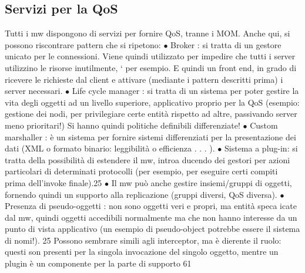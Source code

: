 \subsection{Servizi per la QoS}
Tutti i mw dispongono di servizi per fornire QoS, tranne i MOM. Anche qui, si
possono riscontrare pattern che si ripetono:
$\bullet$ Broker : si tratta di un gestore unicato per le connessioni. Viene quindi
utilizzato per impedire che tutti i server utilizzino le risorse inutilmente,
`
per esempio. E quindi un front end, in grado di ricevere le richieste dal
client e attivare (mediante i pattern descritti prima) i server necessari.
$\bullet$ Life cycle manager : si tratta di un sistema per poter gestire la vita degli
oggetti ad un livello superiore, applicativo proprio per la QoS (esempio:
gestione dei nodi, per privilegiare certe entità rispetto ad altre, passivando
server meno prioritari!) Si hanno quindi politiche definibili differenziate!
$\bullet$ Custom marshaller : è un sistema per fornire sistemi differenziati per la
presentazione dei dati (XML o formato binario: leggibilità o efficienza
. . . ).
$\bullet$ Sistema a plug-in: si tratta della possibilità di estendere il mw, introa
ducendo dei gestori per azioni particolari di determinati protocolli (per
esempio, per eseguire certi compiti prima dell'invoke finale).25
$\bullet$ Il mw può anche gestire insiemi/gruppi di oggetti, fornendo quindi un
supporto alla replicazione (gruppi diversi, QoS diversa).
$\bullet$ Presenza di pseudo-oggetti : non sono oggetti veri e propri, ma entità speca
icate dal mw, quindi oggetti accedibili normalmente ma che non hanno
interesse da un punto di vista applicativo (un esempio di pseudo-object
potrebbe essere il sistema di nomi!).
25 Possono sembrare simili agli interceptor, ma è dierente il ruolo: questi son presenti per
la singola invocazione del singolo oggetto, mentre un plugin è un componente per la parte di
supporto
61